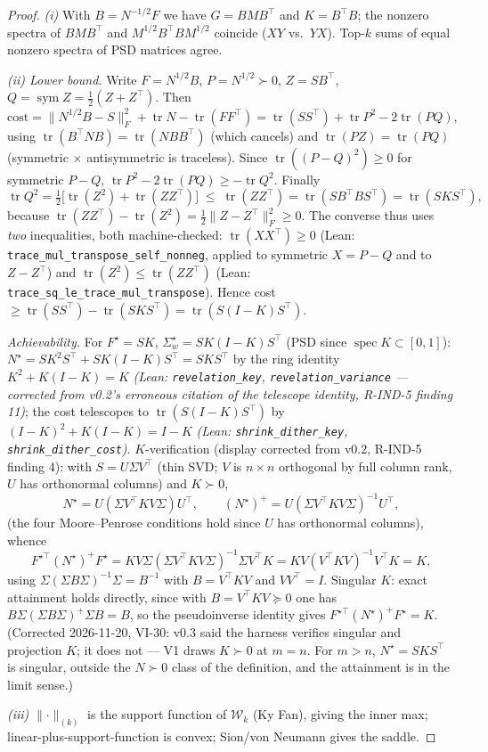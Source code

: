 \documentclass[11pt]{article}
\theoremstyle{definition}
\newcommand{\tr}{\operatorname{tr}}
\newcommand{\KF}[1]{\lVert #1 \rVert_{(k)}}
\newcommand{\sym}{\operatorname{sym}}
\begin{document}
\begin{proof}
\emph{(i)} With $B = N^{-1/2}F$ we have $G = BMB^\top$ and
$K = B^\top B$; the nonzero spectra of $BMB^\top$ and
$M^{1/2}B^\top B M^{1/2}$ coincide ($XY$ vs.\ $YX$). Top-$k$ sums of
equal nonzero spectra of PSD matrices agree.

\emph{(ii) Lower bound.} Write $F = N^{1/2}B$, $P = N^{1/2}\succ0$,
$Z = SB^\top$, $Q = \sym Z = \tfrac12(Z+Z^\top)$. Then
\[
\text{cost}
= \lVert N^{1/2}B - S\rVert_F^2 + \tr N - \tr(FF^\top)
= \tr(SS^\top) + \tr P^2 - 2\tr(PQ),
\]
using $\tr(B^\top N B) = \tr(N BB^\top)$ (which cancels) and
$\tr(PZ) = \tr(PQ)$ (symmetric $\times$ antisymmetric is
traceless). Since $\tr((P-Q)^2)\ge0$ for symmetric $P-Q$,
$\tr P^2 - 2\tr(PQ) \ge -\tr Q^2$. Finally
\[
\tr Q^2 = \tfrac12\big[\tr(Z^2) + \tr(ZZ^\top)\big]
\;\le\; \tr(ZZ^\top) = \tr(SB^\top B S^\top) = \tr(SKS^\top),
\]
because $\tr(ZZ^\top)-\tr(Z^2) = \tfrac12\lVert
Z-Z^\top\rVert_F^2\ge0$. The converse thus uses \emph{two}
inequalities, both machine-checked: $\tr(XX^\top)\ge0$ (Lean:
\texttt{trace\_mul\_transpose\_self\_nonneg}, applied to symmetric
$X = P-Q$ and to $Z - Z^\top$) and $\tr(Z^2)\le\tr(ZZ^\top)$ (Lean:
\texttt{trace\_sq\_le\_trace\_mul\_transpose}). Hence cost
$\ge \tr(SS^\top) - \tr(SKS^\top) = \tr(S(I-K)S^\top)$.

\emph{Achievability.} For $F^\star = SK$, $\Sigma_w^\star =
SK(I-K)S^\top$ (PSD since $\operatorname{spec}K\subset[0,1]$):
$N^\star = SK^2S^\top + SK(I-K)S^\top = SKS^\top$ by the ring
identity $K^2 + K(I-K) = K$ \emph{(Lean: \texttt{revelation\_key},
\texttt{revelation\_variance} --- corrected from v0.2's erroneous
citation of the telescope identity, R-IND-5 finding 11)}; the cost
telescopes to $\tr(S(I-K)S^\top)$ by $(I-K)^2 + K(I-K) = I-K$
\emph{(Lean: \texttt{shrink\_dither\_key},
\texttt{shrink\_dither\_cost})}. $K$-verification (display corrected
from v0.2, R-IND-5 finding 4): with $S = U\Sigma V^\top$ (thin SVD;
$V$ is $n\times n$ orthogonal by full column rank, $U$ has
orthonormal columns) and $K\succ0$,
\[
N^\star = U(\Sigma V^\top K V \Sigma)U^\top,\qquad
(N^\star)^{+} = U(\Sigma V^\top K V \Sigma)^{-1}U^\top,
\]
(the four Moore--Penrose conditions hold since $U$ has orthonormal
columns), whence
\[
F^{\star\top}(N^\star)^{+}F^\star
= KV\Sigma(\Sigma V^\top K V \Sigma)^{-1}\Sigma V^\top K
= KV(V^\top K V)^{-1}V^\top K = K,
\]
using $\Sigma(\Sigma B\Sigma)^{-1}\Sigma = B^{-1}$ with
$B = V^\top KV$ and $VV^\top = I$. Singular $K$: exact attainment
holds directly, since with $B=V^\top KV\succeq0$ one has
$B\Sigma(\Sigma B\Sigma)^{+}\Sigma B=B$, so the pseudoinverse identity
gives $F^{\star\top}(N^\star)^{+}F^\star=K$. (Corrected 2026-11-20,
VI-30: v0.3 said the harness verifies singular and projection $K$; it
does not --- V1 draws $K\succ0$ at $m=n$. For $m>n$, $N^\star=SKS^\top$
is singular, outside the $N\succ0$ class of the definition, and the
attainment is in the limit sense.)

\emph{(iii)} $\KF{\cdot}$ is the support function of $\mathcal W_k$
(Ky Fan), giving the inner max; linear-plus-support-function is
convex; Sion/von Neumann gives the saddle.
\end{proof}
\end{document}
